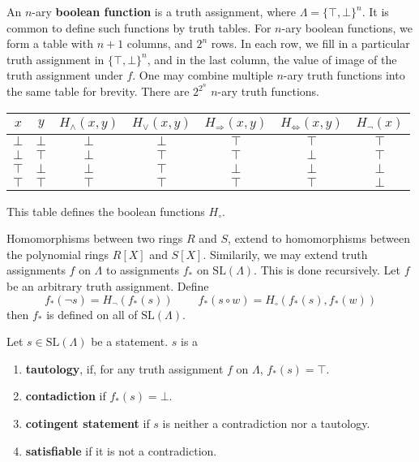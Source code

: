 \begin{example}
    An $n$-ary {\bf boolean function} is a truth assignment, where $\Lambda = \{ \top, \bot \}^n$. It is common to define such functions by truth tables. For $n$-ary boolean functions, we form a table with $n + 1$ columns, and $2^{n}$ rows. In each row, we fill in a particular truth assignment in $\{ \top, \bot \}^n$, and in the last column, the value of image of the truth assignment under $f$. One may combine multiple $n$-ary truth functions into the same table for brevity. There are $2^{2^{n}}$ $n$-ary truth functions.
    \begin{center}
    \begin{tabular}{| c | c | c | c | c | c | c |}
        \hline $x$ & $y$ & $H_\wedge(x,y)$ & $H_\vee(x,y)$ & $H_\Rightarrow(x,y)$ & $H_\Leftrightarrow(x,y)$ & $H_\neg(x)$ \\
        \hline $\bot$ & $\bot$ & $\bot$ & $\bot$ & $\top$ & $\top$ & $\top$ \\
        $\bot$ & $\top$ & $\bot$ & $\top$ & $\top$ & $\bot$ & $\top$ \\
        $\top$ & $\bot$ & $\bot$ & $\top$ & $\bot$ & $\bot$ & $\bot$ \\
        $\top$ & $\top$ & $\top$ & $\top$ & $\top$ & $\top$ & $\bot$ \\
        \hline
    \end{tabular}
    \end{center}
    This table defines the boolean functions $H_\circ$.
\end{example}

Homomorphisms between two rings $R$ and $S$, extend to homomorphisms between the polynomial rings $R[X]$ and $S[X]$. Similarily, we may extend truth assignments $f$ on $\Lambda$ to assignments $f_*$ on $\text{SL}(\Lambda)$. This is done recursively. Let $f$ be an arbitrary truth assignment. Define
%
\[ f_*(\neg s) = H_\neg(f_*(s))\ \ \ \ \ \ \ \ \ \ f_*(s \circ w) = H_\circ(f_*(s), f_*(w)) \]
%
then $f_*$ is defined on all of $\text{SL}(\Lambda)$.

\begin{definition}
    Let $s \in \text{SL}(\Lambda)$ be a statement. $s$ is a
    \begin{enumerate}
        \item {\bf tautology}, if, for any truth assignment $f$ on $\Lambda$, $f_*(s) = \top$.
        \item {\bf contadiction} if $f_*(s) = \bot$.
        \item {\bf cotingent statement} if $s$ is neither a contradiction nor a tautology.
        \item {\bf satisfiable} if it is not a contradiction.
    \end{enumerate}
\end{definition}

